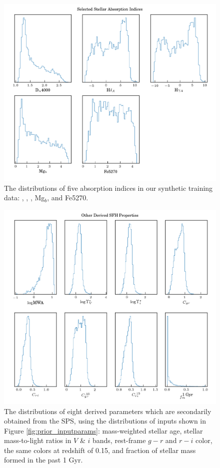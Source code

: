 \begin{figure}
    \centering
    \includegraphics[width=\textwidth]{prior_specinds}
    \caption[Distributions of absorption indices in training data]{\fixspacing The distributions of five absorption indices in our synthetic training data: \Dn, \HdeltaA, \HgammaA, Mg$_b$, and Fe5270.}
    \label{fig:prior_specinds}
\end{figure}

\begin{figure}
    \centering
    \includegraphics[width=\textwidth]{prior_otherderived}
    \caption[Distributions of derived SFH properties in training data]{\fixspacing The distributions of eight derived parameters which are secondarily obtained from the SPS, using the distributions of inputs shown in Figure \ref{fig:prior_inputparams}: mass-weighted stellar age, stellar mass-to-light ratios in $V$ \& $i$ bands, rest-frame $g-r$ and $r-i$ color, the same colors at redshift of 0.15, and fraction of stellar mass formed in the past 1 Gyr.}
    \label{fig:prior_otherderived}
\end{figure}


